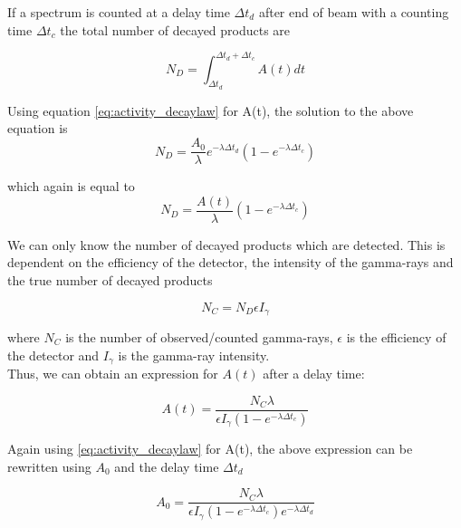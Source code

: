 \noindent 
If a spectrum is counted at a delay time $\Delta t_d$ after end of beam with a counting time $\Delta t_c$  the total number of decayed products are 

\begin{equation}
    N_D = \int_{\Delta t_d}^{\Delta t_d + \Delta t_c} A(t) dt
\end{equation}

Using equation \ref{eq:activity_decaylaw} for A(t), the solution to the above equation is 
\begin{equation} \label{eq:numb_of_decayed}
    N_D= \frac{A_0}{\lambda}e^{-\lambda \Delta t_d}(1-e^{-\lambda \Delta t_c})
\end{equation}

which again is equal to
\begin{equation}
    N_D = \frac{A(t)}{\lambda} (1-e^{-\lambda \Delta t_c})
\end{equation}

We can only know the number of decayed products which are detected. This is dependent on the efficiency of the detector, the intensity of the gamma-rays and the true number of decayed products

\begin{equation}\label{eq:Ngamma}
    N_C  = N_D \epsilon I_\gamma
\end{equation}

where $N_C$ is the number of observed/counted gamma-rays, $\epsilon$ is the efficiency of the detector and $I_\gamma$ is the gamma-ray intensity.\\ 

\noindent
Thus, we can obtain an expression for $A(t)$ after a delay time: 

\begin{equation} \label{eq:Final_Expression_A}
    A(t) = \frac{N_C \lambda}{\epsilon I_\gamma (1-e^{-\lambda \Delta t_c})}
\end{equation}

\noindent 
Again using \ref{eq:activity_decaylaw} for A(t), the above expression can be rewritten using $A_0$ and the delay time $\Delta t_d$

\begin{equation} \label{eq:Final_Expression_A0}
    A_0 = \frac{N_C \lambda }{\epsilon I_\gamma (1-e^{-\lambda \Delta t_c})e^{-\lambda \Delta t_d}}
\end{equation}

